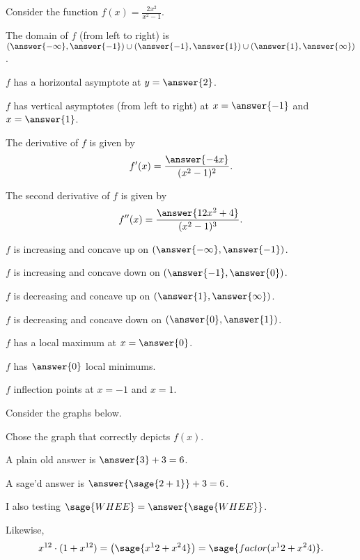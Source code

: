 \documentclass{ximera}
\begin{document}
\begin{exercise}

Consider the function $f(x) = \frac{2x^2}{x^2-1}$.

The domain of $f$ (from left to right) is $\left(\answer{-\infty},\answer{-1}\right)\cup\left(\answer{-1},\answer{1}\right)\cup\left(\answer{1},\answer{\infty}\right)$.

$f$ has a horizontal asymptote at $y=\answer{2}$.

$f$ has vertical asymptotes (from left to right) at $x=\answer{-1}$ and $x=\answer{1}$.

The derivative of $f$ is given by 
\[
f'(x) =\frac{ \answer{-4x}}{(x^2-1)^2}.
\]

The second derivative of $f$ is given by
\[
f''(x) =\frac{ \answer{12x^2+4}}{(x^2-1)^3}.
\]

$f$ is increasing and concave up on $\left(\answer{-\infty},\answer{-1}\right)$.

$f$ is increasing and concave down on $\left(\answer{-1},\answer{0}\right)$.

$f$ is decreasing and concave up on $\left(\answer{1},\answer{\infty}\right)$.

$f$ is decreasing and concave down on $\left(\answer{0},\answer{1}\right)$.

$f$ has a local maximum at $x=\answer{0}$.

$f$ has $\answer{0}$ local minimums.

$f$  inflection points at $x=-1$ and $x=1$.

Consider the graphs below.

Chose the graph that correctly depicts $f(x)$.
\begin{multipleChoice}
\end{multipleChoice}


\end{exercise}

\begin{problem}
  A plain old answer is $\answer{3} + 3 = 6$.

  A sage'd answer is $\answer{\sage{2+1}} + 3 = 6$.
\end{problem}

I also testing $\sage{WHEE} = \answer{\sage{WHEE}}$.

Likewise,
\[
  x^{12} \cdot (1 + x^{12}) = \left(\sage{x^12 + x^24}\right) = \sage{factor(x^12 + x^24)}.
\]
\end{document}
